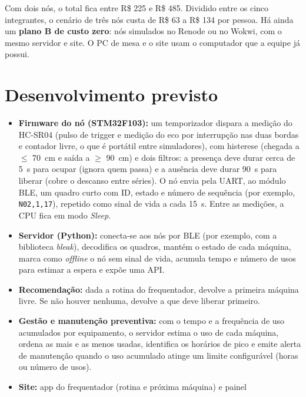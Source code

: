 \documentclass[11pt,a4paper]{article}
\begin{document}
Com dois nós, o total fica entre R\$ 225 e R\$ 485. Dividido entre os cinco
integrantes, o cenário de três nós custa de R\$ 63 a R\$ 134 por pessoa. Há
ainda um \textbf{plano B de custo zero}: nós simulados no Renode ou no Wokwi, com
o mesmo servidor e site. O PC de mesa e o site usam o computador que a equipe já
possui.

\section{Desenvolvimento previsto}\label{sec:dev}

\begin{itemize}
  \item \textbf{Firmware do nó (STM32F103):} um temporizador dispara a medição
        do HC-SR04 (pulso de trigger e medição do eco por interrupção nas duas bordas e contador livre, o que é portátil entre simuladores), com histerese
        (chegada a $\leq$ 70~cm e saída a $\geq$ 90~cm) e dois filtros: a
        presença deve durar cerca de 5~s para ocupar (ignora quem passa) e a
        ausência deve durar 90~s para liberar (cobre o descanso entre séries).
        O nó envia pela UART, ao módulo BLE, um quadro curto com ID, estado e
        número de sequência (por exemplo, \texttt{N02,1,17}), repetido como
        sinal de vida a cada 15~s. Entre as medições, a CPU fica em modo
        \emph{Sleep}.
  \item \textbf{Servidor (Python):} conecta-se aos nós por BLE (por exemplo, com
        a biblioteca \emph{bleak}), decodifica os quadros, mantém o estado de cada
        máquina, marca como \emph{offline} o nó sem sinal de vida, acumula
        tempo e número de usos para estimar a espera e expõe uma API.
  \item \textbf{Recomendação:} dada a rotina do frequentador, devolve a primeira
        máquina livre. Se não houver nenhuma, devolve a que deve liberar
        primeiro.
  \item \textbf{Gestão e manutenção preventiva:} com o tempo e a frequência de
        uso acumulados por equipamento, o servidor estima o uso de cada máquina,
        ordena as mais e as menos usadas, identifica os horários de pico e
        emite alerta de manutenção quando o uso acumulado atinge um limite
        configurável (horas ou número de usos).
  \item \textbf{Site:} app do frequentador (rotina e próxima máquina) e painel

\end{itemize}
\end{document}
